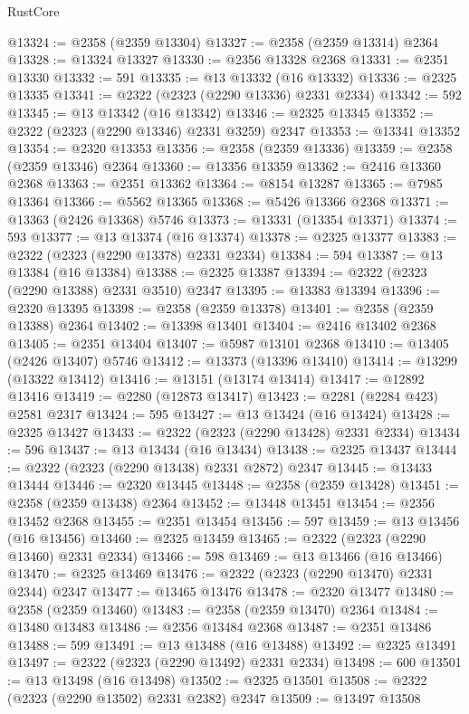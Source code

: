 \begin{lexlean}{RustCore}
\begin{coremodule}
@13324 := @2358 (@2359 @13304)
@13327 := @2358 (@2359 @13314) @2364
@13328 := @13324 @13327
@13330 := @2356 @13328 @2368
@13331 := @2351 @13330
@13332 := 591
@13335 := @13 @13332 (@16 @13332)
@13336 := @2325 @13335
@13341 := @2322 (@2323 (@2290 @13336) @2331 @2334)
@13342 := 592
@13345 := @13 @13342 (@16 @13342)
@13346 := @2325 @13345
@13352 := @2322 (@2323 (@2290 @13346) @2331 @3259) @2347
@13353 := @13341 @13352
@13354 := @2320 @13353
@13356 := @2358 (@2359 @13336)
@13359 := @2358 (@2359 @13346) @2364
@13360 := @13356 @13359
@13362 := @2416 @13360 @2368
@13363 := @2351 @13362
@13364 := @8154 @13287
@13365 := @7985 @13364
@13366 := @5562 @13365
@13368 := @5426 @13366 @2368
@13371 := @13363 (@2426 @13368) @5746
@13373 := @13331 (@13354 @13371)
@13374 := 593
@13377 := @13 @13374 (@16 @13374)
@13378 := @2325 @13377
@13383 := @2322 (@2323 (@2290 @13378) @2331 @2334)
@13384 := 594
@13387 := @13 @13384 (@16 @13384)
@13388 := @2325 @13387
@13394 := @2322 (@2323 (@2290 @13388) @2331 @3510) @2347
@13395 := @13383 @13394
@13396 := @2320 @13395
@13398 := @2358 (@2359 @13378)
@13401 := @2358 (@2359 @13388) @2364
@13402 := @13398 @13401
@13404 := @2416 @13402 @2368
@13405 := @2351 @13404
@13407 := @5987 @13101 @2368
@13410 := @13405 (@2426 @13407) @5746
@13412 := @13373 (@13396 @13410)
@13414 := @13299 (@13322 @13412)
@13416 := @13151 (@13174 @13414)
@13417 := @12892 @13416
@13419 := @2280 (@12873 @13417)
@13423 := @2281 (@2284 @423) @2581 @2317
@13424 := 595
@13427 := @13 @13424 (@16 @13424)
@13428 := @2325 @13427
@13433 := @2322 (@2323 (@2290 @13428) @2331 @2334)
@13434 := 596
@13437 := @13 @13434 (@16 @13434)
@13438 := @2325 @13437
@13444 := @2322 (@2323 (@2290 @13438) @2331 @2872) @2347
@13445 := @13433 @13444
@13446 := @2320 @13445
@13448 := @2358 (@2359 @13428)
@13451 := @2358 (@2359 @13438) @2364
@13452 := @13448 @13451
@13454 := @2356 @13452 @2368
@13455 := @2351 @13454
@13456 := 597
@13459 := @13 @13456 (@16 @13456)
@13460 := @2325 @13459
@13465 := @2322 (@2323 (@2290 @13460) @2331 @2334)
@13466 := 598
@13469 := @13 @13466 (@16 @13466)
@13470 := @2325 @13469
@13476 := @2322 (@2323 (@2290 @13470) @2331 @2344) @2347
@13477 := @13465 @13476
@13478 := @2320 @13477
@13480 := @2358 (@2359 @13460)
@13483 := @2358 (@2359 @13470) @2364
@13484 := @13480 @13483
@13486 := @2356 @13484 @2368
@13487 := @2351 @13486
@13488 := 599
@13491 := @13 @13488 (@16 @13488)
@13492 := @2325 @13491
@13497 := @2322 (@2323 (@2290 @13492) @2331 @2334)
@13498 := 600
@13501 := @13 @13498 (@16 @13498)
@13502 := @2325 @13501
@13508 := @2322 (@2323 (@2290 @13502) @2331 @2382) @2347
@13509 := @13497 @13508

\end{coremodule}
\end{lexlean}
